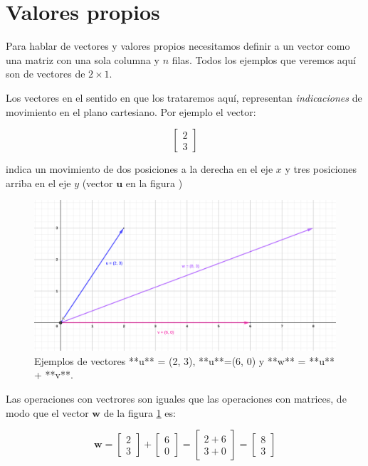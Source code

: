 \documentclass[
]{book}
\begin{document}
\hypertarget{valores-propios}{%
\section{Valores propios}\label{valores-propios}}

Para hablar de vectores y valores propios necesitamos definir a un vector como una matriz con una sola columna y \(n\) filas. Todos los ejemplos que veremos aquí son de vectores de \(2 \times 1\).

Los vectores en el sentido en que los trataremos aquí, representan \emph{indicaciones} de movimiento en el plano cartesiano. Por ejemplo el vector:

\[\left[ 
\begin{array}{cc}
2 \\ 3
\end{array}
\right]\]

indica un movimiento de dos posiciones a la derecha en el eje \(x\) y tres posiciones arriba en el eje \(y\) (vector \(\mathbf{u}\) en la figura )

\begin{figure}

{\centering \includegraphics[width=32.06in]{Unidad-V/Vectores} 

}

\caption{Ejemplos de vectores **u** = (2, 3), **u**=(6, 0) y **w** = **u** + **v**.}\label{fig:vectores}
\end{figure}

Las operaciones con vectrores son iguales que las operaciones con matrices, de modo que el vector \(\mathbf{w}\) de la figura \ref{fig:vectores} es:

\[\mathbf{w} =\left[
\begin{array}{c}
2 \\ 3
\end{array}
\right]  + 
\left[
\begin{array}{c}
6 \\ 0
\end{array}
\right] = 
\left[
\begin{array}{c}
2 + 6 \\ 3 +0
\end{array}
\right] =
\left[
\begin{array}{c}
8 \\ 3
\end{array}
\right]\]
\end{document}
